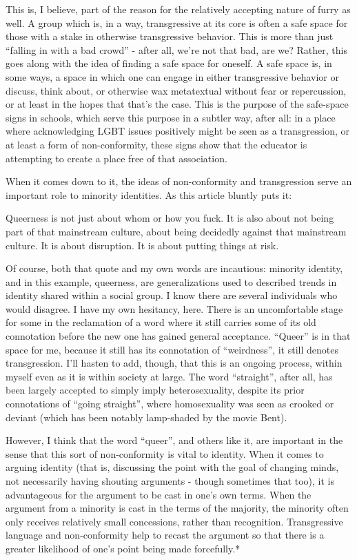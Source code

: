 This is, I believe, part of the reason for the relatively accepting nature of furry as well. A group which is, in a way, transgressive at its core is often a safe space for those with a stake in otherwise transgressive behavior. This is more than just ``falling in with a bad crowd'' - after all, we're not that bad, are we? Rather, this goes along with the idea of finding a safe space for oneself. A safe space is, in some ways, a space in which one can engage in either transgressive behavior or discuss, think about, or otherwise wax metatextual without fear or repercussion, or at least in the hopes that that's the case. This is the purpose of the safe-space signs in schools, which serve this purpose in a subtler way, after all: in a place where acknowledging LGBT issues positively might be seen as a transgression, or at least a form of non-conformity, these signs show that the educator is attempting to create a place free of that association.

When it comes down to it, the ideas of non-conformity and transgression serve an important role to minority identities. As this article bluntly puts it:

Queerness is not just about whom or how you fuck. It is also about not being part of that mainstream culture, about being decidedly against that mainstream culture. It is about disruption. It is about putting things at risk.

Of course, both that quote and my own words are incautious: minority identity, and in this example, queerness, are generalizations used to described trends in identity shared within a social group. I know there are several individuals who would disagree. I have my own hesitancy, here. There is an uncomfortable stage for some in the reclamation of a word where it still carries some of its old connotation before the new one has gained general acceptance. ``Queer'' is in that space for me, because it still has its connotation of ``weirdness'', it still denotes transgression. I'll hasten to add, though, that this is an ongoing process, within myself even as it is within society at large. The word ``straight'', after all, has been largely accepted to simply imply heterosexuality, despite its prior connotations of ``going straight'', where homosexuality was seen as crooked or deviant (which has been notably lamp-shaded by the movie Bent).

However, I think that the word ``queer'', and others like it, are important in the sense that this sort of non-conformity is vital to identity. When it comes to arguing identity (that is, discussing the point with the goal of changing minds, not necessarily having shouting arguments - though sometimes that too), it is advantageous for the argument to be cast in one's own terms. When the argument from a minority is cast in the terms of the majority, the minority often only receives relatively small concessions, rather than recognition. Transgressive language and non-conformity help to recast the argument so that there is a greater likelihood of one's point being made forcefully.*

